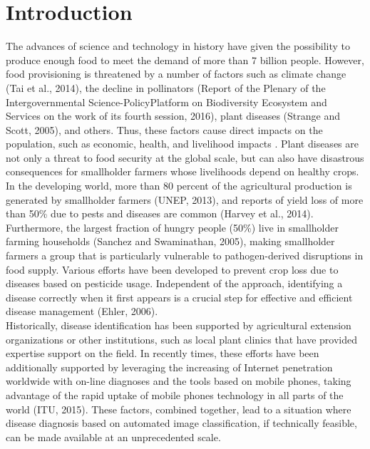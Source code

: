 \section{Introduction}
The advances of science and technology in history have given the possibility to produce enough food to meet the demand of more than 7 billion people. However, food provisioning is threatened by a number of factors such as climate change (Tai et al., 2014), the decline in pollinators (Report of the Plenary of the Intergovernmental Science-PolicyPlatform on Biodiversity Ecosystem and Services on the work of its fourth session, 2016), plant diseases (Strange and Scott, 2005), and others. Thus, these factors cause direct impacts on the population, such as economic, health, and livelihood impacts \cite{AuthorsMasnzonis}. Plant diseases are not only a threat to food security at the global scale, but can also have disastrous consequences for smallholder farmers whose livelihoods depend on healthy crops. In the developing world, more than 80 percent of the agricultural production is generated by smallholder farmers (UNEP, 2013), and reports of yield loss of more than 50\% due to pests and diseases are common (Harvey et al., 2014). Furthermore, the largest fraction of hungry people (50\%) live in smallholder farming households (Sanchez and Swaminathan, 2005), making smallholder farmers a group that is particularly vulnerable to pathogen-derived disruptions in food supply.
Various efforts have been developed to prevent crop loss due to diseases based on pesticide usage. Independent of the approach, identifying a disease correctly when it first appears is a crucial step for effective and efficient disease management (Ehler, 2006).
\\Historically, disease identification has been supported by agricultural extension organizations or other institutions, such as local plant clinics that have provided expertise support on the field. In recently times, these efforts have been additionally supported by leveraging the increasing of Internet penetration worldwide with on-line diagnoses and the tools based on mobile phones, taking advantage of the rapid uptake of mobile phones technology in all parts of the world (ITU, 2015). These factors, combined together, lead to a situation where disease diagnosis based on automated image classification, if technically feasible, can be made available at an unprecedented scale.
